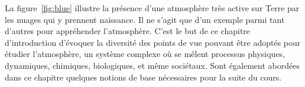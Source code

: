 \sk
La figure~\ref{fig:blue} illustre la présence d'une atmosphère très active sur Terre par les nuages qui y prennent naissance. Il ne s'agit que d'un exemple parmi tant d'autres pour appréhender l'atmosphère. C'est le but de ce chapitre d'introduction d'évoquer la diversité des points de vue pouvant être adoptés pour étudier l'atmosphère, un système complexe où se mêlent processus physiques, dynamiques, chimiques, biologiques, et même sociétaux. Sont également abordées dans ce chapitre quelques notions de base nécessaires pour la suite du cours.



